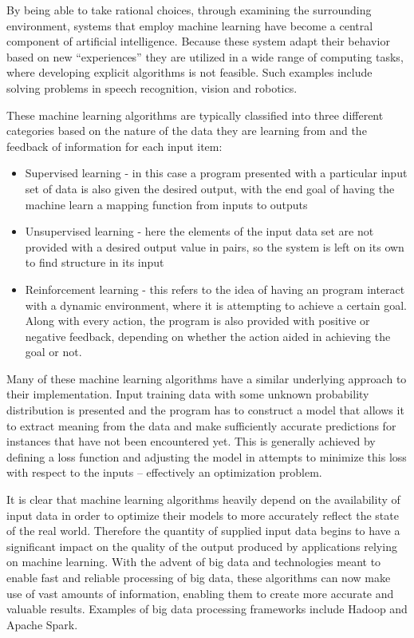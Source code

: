 \documentclass{l4proj}
\begin{document}
By being able to take rational choices, through examining the surrounding environment, systems that employ machine learning have become a central component of artificial intelligence. Because these system adapt their behavior based on new ``experiences'' they are utilized in a wide range of computing tasks, where developing explicit algorithms is not feasible. Such examples include solving problems in speech recognition, vision and robotics.

These machine learning algorithms are typically classified into three different categories based on the nature of the data they are learning from and the feedback of information for each input item:

\begin{itemize}
\item Supervised learning - in this case a program presented with a particular input set of data is also given the desired output, with the end goal of having the machine learn a mapping function from inputs to outputs
\item Unsupervised learning - here the elements of the input data set are not provided with a desired output value in pairs, so the system is left on its own to find structure in its input
\item Reinforcement learning - this refers to the idea of having an program interact with a dynamic environment, where it is attempting to achieve a certain goal. Along with every action, the program is also provided with positive or negative feedback, depending on whether the action aided in achieving the goal or not. 
\end{itemize}

Many of these machine learning algorithms have a similar underlying approach to their implementation. Input training data with some unknown probability distribution is presented and the program has to construct a model that allows it to extract meaning from the data and make sufficiently accurate predictions for instances that have not been encountered yet. This is generally achieved by defining a loss function and adjusting the model in attempts to minimize this loss with respect to the inputs -- effectively an optimization problem.

It is clear that machine learning algorithms heavily depend on the availability of input data in order to optimize their models to more accurately reflect the state of the real world. Therefore the quantity of supplied input data begins to have a significant impact on the quality of the output produced by applications relying on machine learning. With the advent of big data and technologies meant to enable fast and reliable processing of big data, these algorithms can now make use of vast amounts of information, enabling them to create more accurate and valuable results. Examples of big data processing frameworks include Hadoop and Apache Spark.
\end{document}
